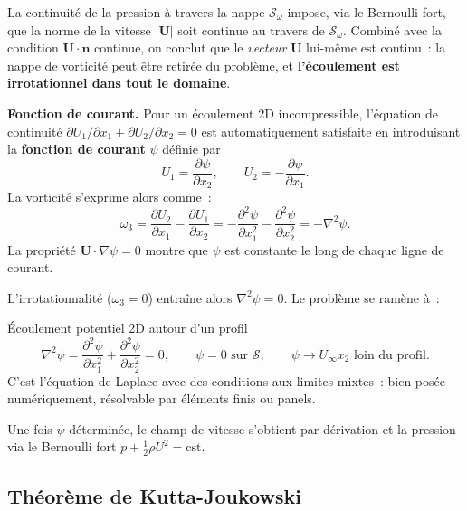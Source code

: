 \documentclass[11pt,a4paper]{report}
\newcommand{\pd}[2]{\dfrac{\partial #1}{\partial #2}}
\begin{document}
La continuit\'e de la pression \`a travers la nappe $\mathcal{S}_\omega$ impose, via le
Bernoulli fort, que la norme de la vitesse $|\boldsymbol{U}|$ soit continue au travers de
$\mathcal{S}_\omega$. Combin\'e avec la condition $\boldsymbol{U}\cdot\boldsymbol{n}$ continue,
on conclut que le \emph{vecteur} $\boldsymbol{U}$ lui-m\^eme est continu~: la nappe de
vorticit\'e peut \^etre retir\'ee du probl\`eme, et \textbf{l'\'ecoulement est irrotationnel
dans tout le domaine}.

\medskip
\noindent\textbf{Fonction de courant.}
Pour un \'ecoulement 2D incompressible, l'\'equation de continuit\'e
$\partial U_1/\partial x_1 + \partial U_2/\partial x_2 = 0$ est automatiquement satisfaite
en introduisant la \textbf{fonction de courant} $\psi$ d\'efinie par
\[
  U_1 = \pd{\psi}{x_2}, \qquad U_2 = -\pd{\psi}{x_1}.
\]
La vorticit\'e s'exprime alors comme~:
\[
  \omega_3 = \pd{U_2}{x_1} - \pd{U_1}{x_2}
  = -\frac{\partial^2\psi}{\partial x_1^2} - \frac{\partial^2\psi}{\partial x_2^2}
  = -\nabla^2\psi.
\]
La propri\'et\'e $\boldsymbol{U}\cdot\nabla\psi = 0$ montre que $\psi$ est constante le long
de chaque ligne de courant.

L'irrotationnalité ($\omega_3 = 0$) entra\^ine alors $\nabla^2\psi = 0$. Le probl\`eme se
ram\`ene \`a~:

\begin{importantbox}{\'Ecoulement potentiel 2D autour d'un profil}
\[
  \nabla^2\psi = \frac{\partial^2\psi}{\partial x_1^2}
  + \frac{\partial^2\psi}{\partial x_2^2} = 0,
  \qquad \psi = 0 \text{ sur } \mathcal{S}, \qquad
  \psi \to U_\infty x_2 \text{ loin du profil.}
\]
C'est l'\'equation de Laplace avec des conditions aux limites mixtes~: bien pos\'ee
num\'eriquement, r\'esolvable par \'el\'ements finis ou panels.
\end{importantbox}

Une fois $\psi$ d\'etermin\'ee, le champ de vitesse s'obtient par d\'erivation et la pression
via le Bernoulli fort $p + \tfrac{1}{2}\rho U^2 = \mathrm{cst}$.

\subsection{Th\'eor\`eme de Kutta-Joukowski}
\end{document}
